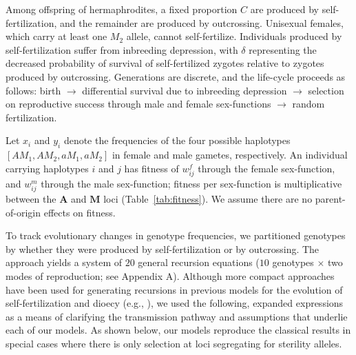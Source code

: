 \documentclass{article}
\begin{document}
Among offspring of hermaphrodites, a fixed proportion $C$ are produced by self-fertilization, and the remainder are produced by outcrossing. Unisexual females, which carry at least one $M_2$ allele, cannot self-fertilize. Individuals produced by self-fertilization suffer from inbreeding depression, with $\delta$ representing the decreased probability of survival of self-fertilized zygotes relative to zygotes produced by outcrossing. Generations are discrete, and the life-cycle proceeds as follows: birth $\rightarrow$ differential survival due to inbreeding depression $\rightarrow$ selection on reproductive success through male and female sex-functions $\rightarrow$ random fertilization.

Let $x_i$ and $y_i$ denote the frequencies of the four possible haplotypes $[AM_1,AM_2,aM_1,aM_2]$ in female and male gametes, respectively. An individual carrying haplotypes $i$ and $j$ has fitness of $w^f_{ij}$ through the female sex-function, and $w^m_{ij}$ through the male sex-function; fitness per sex-function is multiplicative between the $\mathbf{A}$ and $\mathbf{M}$ loci (Table~\ref{tab:fitness}). We assume there are no parent-of-origin effects on fitness.

To track evolutionary changes in genotype frequencies, we partitioned genotypes by whether they were produced by self-fertilization or by outcrossing. The approach yields a system of $20$ general recursion equations ($10$ genotypes $\times$ two modes of reproduction; see Appendix A). Although more compact approaches have been used for generating recursions in previous models for the evolution of self-fertilization and dioecy (e.g., \citealt{Charlesworth1978a, Charlesworth2010}), we used the following, expanded expressions as a means of clarifying the transmission pathway and assumptions that underlie each of our models. As shown below, our models reproduce the classical results in special cases where there is only selection at loci segregating for sterility alleles.
\end{document}
